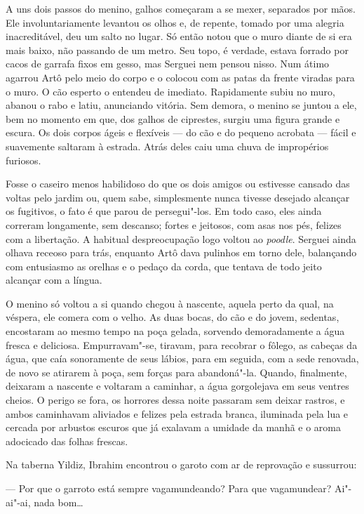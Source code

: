 A uns dois passos do menino, galhos começaram a se mexer, separados por
mãos. Ele involuntariamente levantou os olhos e, de repente, tomado por
uma alegria inacreditável, deu um salto no lugar. Só então notou que o
muro diante de si era mais baixo, não passando de um metro. Seu topo, é
verdade, estava forrado por cacos de garrafa fixos em gesso, mas Serguei
nem pensou nisso. Num átimo agarrou Artô pelo meio do corpo e o
colocou com as patas da frente viradas para o muro. O cão esperto o
entendeu de imediato. Rapidamente subiu no muro, abanou o rabo e latiu,
anunciando vitória. Sem demora, o menino se juntou a ele, bem no momento
em que, dos galhos de ciprestes, surgiu uma figura grande e escura. Os
dois corpos ágeis e flexíveis --- do cão e do pequeno acrobata --- fácil
e suavemente saltaram à estrada. Atrás deles caiu uma chuva de
impropérios furiosos.

Fosse o caseiro menos habilidoso do que os dois amigos ou estivesse
cansado das voltas pelo jardim ou, quem sabe, simplesmente nunca tivesse
desejado alcançar os fugitivos, o fato é que parou de persegui"-los. Em
todo caso, eles ainda correram longamente, sem descanso; fortes e
jeitosos, com asas nos pés, felizes com a libertação. A habitual
despreocupação logo voltou ao \emph{poodle}. Serguei ainda olhava
receoso para trás, enquanto Artô dava pulinhos em torno dele, balançando
com entusiasmo as orelhas e o pedaço da corda, que tentava de todo jeito
alcançar com a língua.

O menino só voltou a si quando chegou à nascente, aquela perto da qual,
na véspera, ele comera com o velho. As duas bocas, do cão e do jovem,
sedentas, encostaram ao mesmo tempo na poça gelada, sorvendo
demoradamente a água fresca e deliciosa. Empurravam"-se, tiravam, para
recobrar o fôlego, as cabeças da água, que caía sonoramente de seus
lábios, para em seguida, com a sede renovada, de novo se atirarem à
poça, sem forças para abandoná"-la. Quando, finalmente, deixaram a
nascente e voltaram a caminhar, a água gorgolejava em seus ventres
cheios. O perigo se fora, os horrores dessa noite passaram sem deixar
rastros, e ambos caminhavam aliviados e felizes pela estrada branca,
iluminada pela lua e cercada por arbustos escuros que já exalavam a
umidade da manhã e o aroma adocicado das folhas frescas.

Na taberna Yildiz, Ibrahim encontrou o garoto com ar de reprovação e
sussurrou:

--- Por que o garroto está sempre vagamundeando? Para que vagamundear?
Ai"-ai"-ai, nada bom\ldots{}

